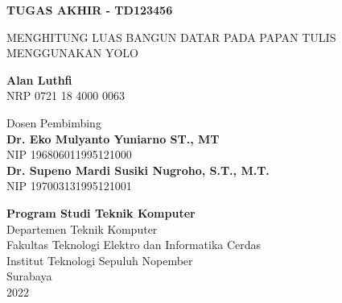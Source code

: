 \begin{flushleft}
  \fontsize{14pt}{17}
  \selectfont
  \textbf{TUGAS AKHIR - TD123456}
\end{flushleft}

\vspace{5ex}

\begin{flushleft}
  \fontsize{18pt}{22}
  \selectfont
  MENGHITUNG LUAS BANGUN DATAR PADA PAPAN TULIS MENGGUNAKAN YOLO
\end{flushleft}

\vspace{6ex}

\begin{flushleft}
  \fontsize{14pt}{17}
  \selectfont
  \textbf{Alan Luthfi}
  \\
  NRP 0721 18 4000 0063
\end{flushleft}

\vspace{6ex}

\begin{flushleft}
  \fontsize{14pt}{17}
  \selectfont
  Dosen Pembimbing\\
  \textbf{Dr. Eko Mulyanto Yuniarno ST., MT} \\
  NIP 196806011995121000 \\
  \textbf{Dr. Supeno Mardi Susiki Nugroho, S.T., M.T.} \\
  NIP 197003131995121001 \\
\end{flushleft}

\vspace{6ex}

\begin{flushleft}
  \fontsize{12pt}{15}
  \selectfont
  \textbf{Program Studi Teknik Komputer}\\
  Departemen Teknik Komputer\\
  Fakultas Teknologi Elektro dan Informatika Cerdas\\
  Institut Teknologi Sepuluh Nopember\\
  Surabaya\\
  2022
\end{flushleft}
